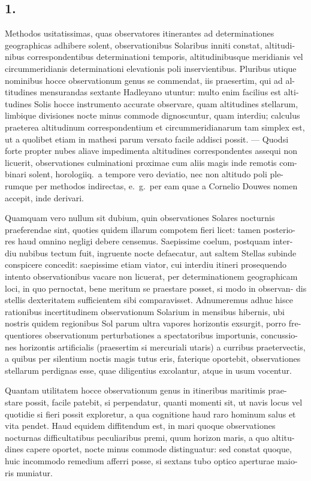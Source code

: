 \documentclass[12pt,a4paper]{article}
\begin{document}
\subsection*{1.}

Methodos usitatissimas, quas observatores itinerantes ad determinationes
geographicas adhibere solent, observationibus Solaribus inniti constat, altitudi-
nibus correspondentibus determinationi temporis, altitudinibusque meridianis vel
circummeridianis determinationi elevationis poli inservientibus. Pluribus utique
nominibus hocce observationum genus se commendat, iis praesertim, qui ad al-
titudines mensurandas sextante Hadleyano utuntur: multo enim facilius est alti-
tudines Solis hocce instrumento accurate observare, quam altitudines stellarum,
limbique divisiones nocte minus commode dignoscuntur, quam interdiu; calculus
praeterea altitudinum correspondentium et circummeridianarum tam simplex est,
ut a quolibet etiam in mathesi parum versato facile addisci possit. --- Quodsi
forte propter nubes aliave impedimenta altitudines correspondentes assequi non
licuerit, observationes culminationi proximae cum aliis magis inde remotis com-
binari solent, horologiiq.\ a tempore vero deviatio, nec non altitudo poli ple-
rumque per methodos indirectas, e.\ g.\ per eam quae a Cornelio Douwes nomen
accepit, inde derivari.

Quamquam vero nullum sit dubium, quin observationes Solares nocturnis
praeferendae sint, quoties quidem illarum compotem fieri licet: tamen posterio-
res haud omnino negligi debere censemus. Saepissime coelum, postquam inter-
diu nubibus tectum fuit, ingruente nocte defaecatur, aut saltem Stellas subinde
conspicere concedit: saepissime etiam viator, cui interdiu itineri prosequendo
intento observationibus vacare non licuerat, per determinationem geographicam
loci, in quo pernoctat, bene meritum se praestare posset, si modo in observan-
dis stellis dexteritatem sufficientem sibi comparavisset. Adnumeremus adhuc
hisce rationibus incertitudinem observationum Solarium in mensibus hibernis, ubi
nostris quidem regionibus Sol parum ultra vapores horizontis exsurgit, porro fre-
quentiores observationum perturbationes a spectatoribus importunis, concussio-
nes horizontis artificialis (praesertim si mercuriali utaris) a curribus praetervectis,
a quibus per silentium noctis magis tutus eris, faterique oportebit, observationes
stellarum perdignas esse, quae diligentius excolantur, atque in usum vocentur.

Quantam utilitatem hocce observationum genus in itineribus maritimis prae-
stare possit, facile patebit, si perpendatur, quanti momenti sit, ut navis locus
vel quotidie si fieri possit exploretur, a qua cognitione haud raro hominum salus
et vita pendet. Haud equidem diffitendum est, in mari quoque observationes
nocturnas difficultatibus peculiaribus premi, quum horizon maris, a quo altitu-
dines capere oportet, nocte minus commode distinguatur: sed constat quoque,
huic incommodo remedium afferri posse, si sextans tubo optico aperturae maio-
ris muniatur.
\end{document}
